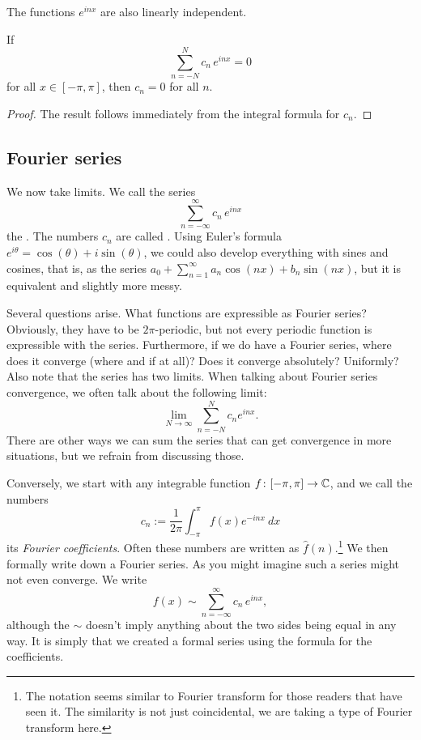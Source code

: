 The functions $e^{inx}$ are also linearly independent.

\begin{prop}
If
\begin{equation*}
\sum_{n=-N}^N c_n \, e^{inx} = 0
\end{equation*}
for all $x \in [-\pi,\pi]$, then $c_n = 0$ for all $n$.
\end{prop}

\begin{proof}
The result follows immediately from the integral formula for $c_n$.
\end{proof}

\subsection{Fourier series}

We now take limits.  We call the series
\begin{equation*}
\sum_{n=-\infty}^\infty c_n \, e^{inx}
\end{equation*}
the \emph{}.  The numbers $c_n$
are called \emph{}.  Using
Euler's formula $e^{i\theta} = \cos(\theta) + i \sin (\theta)$,
we could also develop everything with
sines and cosines, that is, as the series
$a_0 + \sum_{n=1}^\infty a_n \cos(nx) + b_n \sin(nx)$,
but it is equivalent and slightly more messy.

Several questions arise.  What functions are expressible as 
Fourier series?  Obviously, they have to be $2\pi$-periodic, but not every
periodic function is expressible with the series.  Furthermore, if we do have
a Fourier series, where does it converge (where and if at all)?  Does it converge
absolutely?  Uniformly?  Also note that the series has two
limits.  When talking about Fourier series convergence, we often
talk about the following limit:
\begin{equation*}
\lim_{N\to\infty} 
\sum_{n=-N}^N c_n e^{inx} .
\end{equation*}
There are other ways we can sum the series that can get convergence in more
situations, but we refrain from discussing those.

\medskip

Conversely, we start with any integrable function $f \colon [-\pi,\pi] \to
{\mathbb{C}}$, and we call the numbers
\begin{equation*}
c_n := 
\frac{1}{2\pi} \int_{-\pi}^\pi
f(x) e^{-inx} ~ dx
\end{equation*}
its \emph{Fourier coefficients}.  Often these numbers are
written as $\hat{f}(n)$.\footnote{The notation seems similar
to Fourier transform for those readers that have seen it.
The similarity is not just
coincidental, we are taking a type of Fourier transform here.}
We then formally write down a Fourier series.
As you might imagine such a series might not even converge.
We write
\begin{equation*}
f(x) \sim
\sum_{n=-\infty}^\infty c_n \, e^{inx} ,
\end{equation*}
although the $\sim$ doesn't imply anything about the two sides being equal
in any way.  It is simply that we created a formal series using the formula
for the coefficients.

